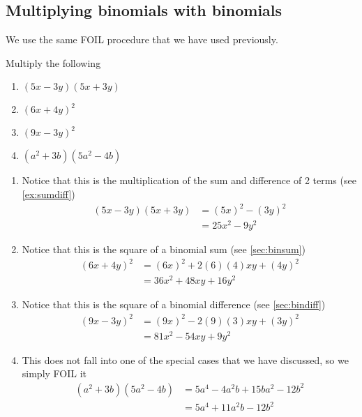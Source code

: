 \subsection{Multiplying binomials with binomials }
We use the same FOIL procedure that we have used previously.

\begin{myexample}
Multiply the following
\begin{multicols}{2}
	\begin{enumerate}
		\item $(5x-3y)(5x+3y)$
		\item $(6x+4y)^2$
		\item $(9x-3y)^2$
		\item $(a^2+3b)(5a^2-4b)$
	\end{enumerate} 
\end{multicols}
\end{myexample}

\begin{myProof}
	\begin{enumerate}
		\item Notice that this is the multiplication of the sum and difference of 2 terms (see \cref{ex:sumdiff})
		\begin{align*}
			(5x-3y)(5x+3y) & =		(5x)^2-(3y)^2 \\
			               & =		25x^2-9y^2    
		\end{align*}		 
		\item Notice that this is the square of a binomial sum (see \cref{sec:binsum})
		\begin{align*}
			(6x+4y)^2 & =		(6x)^2+2(6)(4)xy+(4y)^2 \\
			          & =		36x^2+48xy+16y^2        
		\end{align*} 
		\item Notice that this is the square of a binomial difference (see \cref{sec:bindiff})
		\begin{align*}
			(9x-3y)^2 & =		(9x)^2-2(9)(3)xy+(3y)^2 \\
			          & =		81x^2-54xy+9y^2         
		\end{align*} 
		\item This does not fall into one of the special cases that we have discussed, so we simply FOIL it
		\begin{align*}
			(a^2+3b)(5a^2-4b) & =		5a^4-4a^2b+15ba^2-12b^2 \\
			                  & =		5a^4+11a^2b-12b^2       
		\end{align*} 
	\end{enumerate} 
\end{myProof} 

